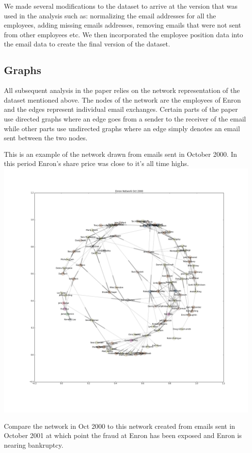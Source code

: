 \documentclass[12pt]{article}
\begin{document}
	We made several modifications to the dataset to arrive at the version that was used in the analysis such as: normalizing the email addresses for all the employees, adding missing emails addresses, removing emails that were not sent from other employees etc. We then incorporated the employee position data into the email data to create the final version of the dataset. 

	\subsection{Graphs}
	All subsequent analysis in the paper relies on the network representation of the dataset mentioned above. The nodes of the network are the employees of Enron and the edges represent individual email exchanges. Certain parts of the paper use directed graphs where an edge goes from a sender to the receiver of the email while other parts use undirected graphs where an edge simply denotes an email sent between the two nodes.
	
	This is an example of the network drawn from emails sent in October 2000. In this period Enron's share price was close to it's all time highs. \\
	\includegraphics[width=1\textwidth]{figureEnronOct2000}
	
	Compare the network in Oct 2000 to this network created from emails sent in October 2001 at which point the fraud at Enron has been exposed and Enron is nearing bankruptcy.
	
\end{document}
